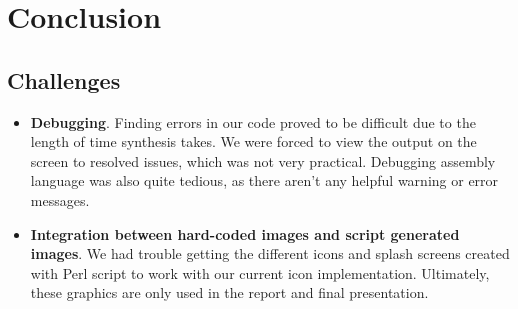 \documentclass[11pt]{article}
\begin{document}

		
		

		
	


\section{Conclusion}


	\subsection{Challenges}
		
		\begin{itemize}				
		
		\item \textbf{Debugging}. Finding errors in our code proved to be difficult due to the length of time synthesis takes. We were forced to view the output on the screen to resolved issues, which was not very practical.  Debugging assembly language was also quite tedious, as there aren't any helpful warning or error messages.
		
		\item \textbf{Integration between hard-coded images and script generated images}.  We had trouble getting the different icons and splash screens created with Perl script to work with our current icon implementation.  Ultimately, these graphics are only used in the report and final presentation.
				
		\end{itemize}
\end{document}
